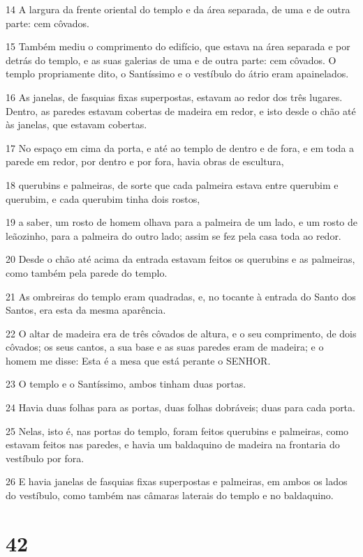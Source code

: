 \par 14 A largura da frente oriental do templo e da área separada, de uma e de outra parte: cem côvados.
\par 15 Também mediu o comprimento do edifício, que estava na área separada e por detrás do templo, e as suas galerias de uma e de outra parte: cem côvados. O templo propriamente dito, o Santíssimo e o vestíbulo do átrio eram apainelados.
\par 16 As janelas, de fasquias fixas superpostas, estavam ao redor dos três lugares. Dentro, as paredes estavam cobertas de madeira em redor, e isto desde o chão até às janelas, que estavam cobertas.
\par 17 No espaço em cima da porta, e até ao templo de dentro e de fora, e em toda a parede em redor, por dentro e por fora, havia obras de escultura,
\par 18 querubins e palmeiras, de sorte que cada palmeira estava entre querubim e querubim, e cada querubim tinha dois rostos,
\par 19 a saber, um rosto de homem olhava para a palmeira de um lado, e um rosto de leãozinho, para a palmeira do outro lado; assim se fez pela casa toda ao redor.
\par 20 Desde o chão até acima da entrada estavam feitos os querubins e as palmeiras, como também pela parede do templo.
\par 21 As ombreiras do templo eram quadradas, e, no tocante à entrada do Santo dos Santos, era esta da mesma aparência.
\par 22 O altar de madeira era de três côvados de altura, e o seu comprimento, de dois côvados; os seus cantos, a sua base e as suas paredes eram de madeira; e o homem me disse: Esta é a mesa que está perante o SENHOR.
\par 23 O templo e o Santíssimo, ambos tinham duas portas.
\par 24 Havia duas folhas para as portas, duas folhas dobráveis; duas para cada porta.
\par 25 Nelas, isto é, nas portas do templo, foram feitos querubins e palmeiras, como estavam feitos nas paredes, e havia um baldaquino de madeira na frontaria do vestíbulo por fora.
\par 26 E havia janelas de fasquias fixas superpostas e palmeiras, em ambos os lados do vestíbulo, como também nas câmaras laterais do templo e no baldaquino.

\chapter{42}

